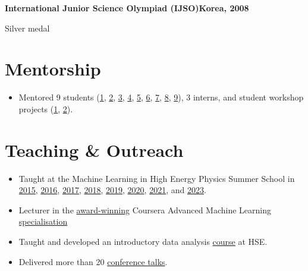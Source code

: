 \documentclass[11pt,a4paper]{article}
\newlength{\projindent}\setlength{\projindent}{1.3em}
\begin{document}
\textbf{International Junior Science Olympiad (IJSO)}\hfill\textbf{Korea, 2008}\par
{\leftskip\projindent Silver medal\par}
\smallskip


\section{Mentorship}
\begin{itemize}
  \item Mentored 9 students (\href{https://www.hse.ru/edu/vkr/219430466}{1}, \href{https://www.hse.ru/edu/vkr/296294066}{2}, \href{https://www.hse.ru/edu/vkr/219524130}{3}, \href{https://www.hse.ru/en/edu/vkr/470561417}{4}, \href{https://www.hse.ru/en/edu/vkr/470935224}{5}, \href{https://www.hse.ru/ma/datasci/students/diplomas/631565328}{6}, \href{https://www.hse.ru/ma/datasci/students/diplomas/631565422}{7}, \href{https://www.hse.ru/edu/vkr/624890096}{8}, \href{https://www.hse.ru/ba/ami/students/diplomas/834351454}{9}), 3 interns, and student workshop projects (\href{https://sochisirius.ru/news/3148}{1}, \href{https://web.archive.org/web/20220512040654/https://academy.yandex.ru/posts/vossozdat-arkhitekturu-bazy-dannykh-i-nauchit-golosovogo-pomoschnika-predskazyvat-namereniya-polzovatelya}{2}).
\end{itemize}
\section{Teaching \& Outreach}
\begin{itemize}
  \item Taught at the Machine Learning in High Energy Physics Summer School in \href{https://indico.cern.ch/event/439520/}{2015}, \href{https://indico.cern.ch/event/497368/}{2016}, \href{https://indico.cern.ch/event/613571/}{2017}, \href{https://indico.cern.ch/event/687473/}{2018}, \href{https://indico.cern.ch/event/768915/}{2019}, \href{https://indico.cern.ch/event/838377/}{2020}, \href{https://indico.cern.ch/event/1025052/}{2021}, and \href{https://indico.cern.ch/event/1229514/}{2023}.
  \item Lecturer in the \href{https://www.hse.ru/en/news/edu/259378493.html}{award-winning} Coursera Advanced Machine Learning \href{https://web.archive.org/web/20220127183223/https://www.coursera.org/specializations/aml}{  specialisation}
  \item Taught and developed an introductory data analysis \href{https://we.hse.ru/en/}{course} at HSE.
  \item Delivered more than 20 \href{https://docs.google.com/document/d/1IOlBse4q0YgEoL\_RCJTvJfbFhFaD\_YMAIJJ3W77B\_X0/edit?usp=sharing}{conference talks}.
\end{itemize}
\end{document}
